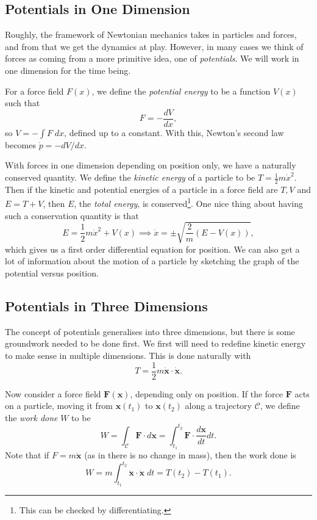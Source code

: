 \documentclass[11pt, a4paper]{scrartcl}
\newcommand{\vv}[1]{\boldsymbol{\mathbf{#1}}}
\theoremstyle{definition}
\begin{document}
\subsection*{Potentials in One Dimension}

Roughly, the framework of Newtonian mechanics takes in particles and forces, and from that we get the dynamics at play. However, in many cases we think of forces as coming from a more primitive idea, one of \emph{potentials}. We will work in one dimension for the time being.

For a force field $F(x)$, we define the \emph{potential energy} to be a function $V(x)$ such that
$$
F = - \frac{dV}{dx},
$$
so $V = -\int F \; dx$, defined up to a constant. With this, Newton's second law becomes $\dot{p} = -dV/dx$.

With forces in one dimension depending on position only, we have a naturally conserved quantity. We define the \emph{kinetic energy} of a particle to be $T = \frac{1}{2}m \dot{x}^2$. Then if the kinetic and potential energies of a particle in a force field are $T, V$ and $E = T + V$, then $E$, the \emph{total energy}, is conserved\footnote{This can be checked by differentiating.}. One nice thing about having such a conservation quantity is that
$$
E = \frac{1}{2}m \dot{x}^2 + V(x) \implies  \dot{x} = \pm \sqrt{\frac{2}{m} (E - V(x))},
$$
which gives us a first order differential equation for position. We can also get a lot of information about the motion of a particle by sketching the graph of the potential versus position.

\subsection*{Potentials in Three Dimensions}

The concept of potentials generalises into three dimensions, but there is some groundwork needed to be done first. We first will need to redefine kinetic energy to make sense in multiple dimensions. This is done naturally with 
$$
T = \frac{1}{2} m \dot{\vv x} \cdot \dot{\vv x}.
$$

Now consider a force field $\vv F(\vv x)$, depending only on position.  If the force $\vv F$ acts on a particle, moving it from $\vv x(t_1)$ to $\vv x(t_2)$ along a trajectory $\mathcal{C}$, we define the \emph{work done} $W$ to be
$$
W = \int_\mathcal{C} \vv F \cdot d \vv x = \int_{t_1}^{t_2} \vv F \cdot \frac{d \vv x}{d t} d t.
$$
Note that if $F = m \ddot{\vv x}$ (as in there is no change in mass), then the work done is
$$
W = m \int_{t_1}^{t_2} \ddot{\vv x} \cdot \dot{\vv x} \; dt = T(t_2) - T(t_1).
$$
\end{document}
